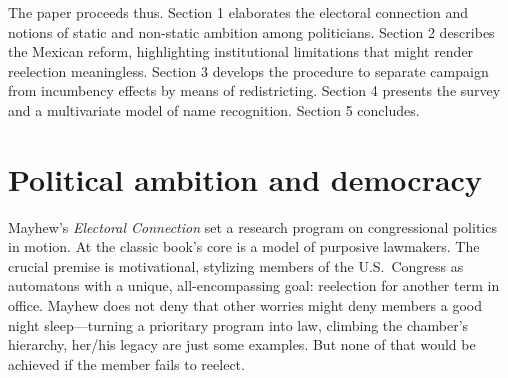 \documentclass[letter,12pt]{article}
\begin{document}
The paper proceeds thus. Section 1 elaborates the electoral connection and notions of static and non-static ambition among politicians. Section 2 describes the Mexican reform, highlighting institutional limitations that might render reelection meaningless. Section 3 develops the procedure to separate campaign from incumbency effects by means of redistricting. Section 4 presents the survey and a multivariate model of name recognition. Section 5 concludes.  




\section{Political ambition and democracy}

Mayhew's \emph{Electoral Connection} \citeyearpar{mayhew.1974} set a research program on congressional politics in motion. At the classic book's core is a model of purposive lawmakers. The crucial premise is motivational, stylizing members of the U.S.\ Congress as automatons with a unique, all-encompassing goal: reelection for another term in office. Mayhew does not deny that other worries might deny members a good night sleep---turning a prioritary program into law, climbing the chamber's hierarchy, her/his legacy are just some examples. But none of that would be achieved if the member fails to reelect. 
\end{document}
